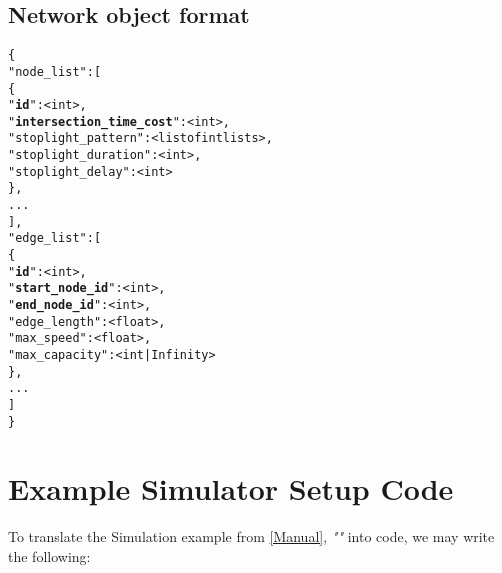 \subsection{Network object format}

\begin{alltt}
\{
    "node_list": [
        \{
            "\textbf{id}": <int>,
            "\textbf{intersection_time_cost}": <int>,
            "stoplight_pattern": <list of int lists>,
            "stoplight_duration": <int>,
            "stoplight_delay": <int>
        \},
        ...
    ],
    "edge_list": [
        \{
            "\textbf{id}": <int>,
            "\textbf{start_node_id}": <int>,
            "\textbf{end_node_id}": <int>,
            "edge_length": <float>,
            "max_speed": <float>,
            "max_capacity": <int | Infinity>
        \},
        ...
    ]
\}
\end{alltt}


\section{Example Simulator Setup Code}
\label{SampleCode}

\par To translate the Simulation example from \autoref{Manual}, \textit{""} into code, we may write the following:

